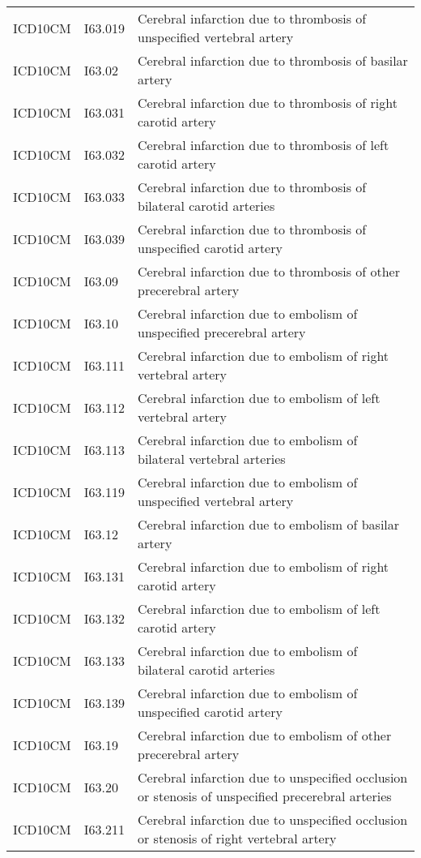 \begin{longtable}{p{}p{}p{}}
  ICD10CM & I63.019 & Cerebral infarction due to thrombosis of unspecified vertebral artery \\ 
  ICD10CM & I63.02 & Cerebral infarction due to thrombosis of basilar artery \\ 
  ICD10CM & I63.031 & Cerebral infarction due to thrombosis of right carotid artery \\ 
  ICD10CM & I63.032 & Cerebral infarction due to thrombosis of left carotid artery \\ 
  ICD10CM & I63.033 & Cerebral infarction due to thrombosis of bilateral carotid arteries \\ 
  ICD10CM & I63.039 & Cerebral infarction due to thrombosis of unspecified carotid artery \\ 
  ICD10CM & I63.09 & Cerebral infarction due to thrombosis of other precerebral artery \\ 
  ICD10CM & I63.10 & Cerebral infarction due to embolism of unspecified precerebral artery \\ 
  ICD10CM & I63.111 & Cerebral infarction due to embolism of right vertebral artery \\ 
  ICD10CM & I63.112 & Cerebral infarction due to embolism of left vertebral artery \\ 
  ICD10CM & I63.113 & Cerebral infarction due to embolism of bilateral vertebral arteries \\ 
  ICD10CM & I63.119 & Cerebral infarction due to embolism of unspecified vertebral artery \\ 
  ICD10CM & I63.12 & Cerebral infarction due to embolism of basilar artery \\ 
  ICD10CM & I63.131 & Cerebral infarction due to embolism of right carotid artery \\ 
  ICD10CM & I63.132 & Cerebral infarction due to embolism of left carotid artery \\ 
  ICD10CM & I63.133 & Cerebral infarction due to embolism of bilateral carotid arteries \\ 
  ICD10CM & I63.139 & Cerebral infarction due to embolism of unspecified carotid artery \\ 
  ICD10CM & I63.19 & Cerebral infarction due to embolism of other precerebral artery \\ 
  ICD10CM & I63.20 & Cerebral infarction due to unspecified occlusion or stenosis of unspecified precerebral arteries \\ 
  ICD10CM & I63.211 & Cerebral infarction due to unspecified occlusion or stenosis of right vertebral artery \\ 

\end{longtable}
